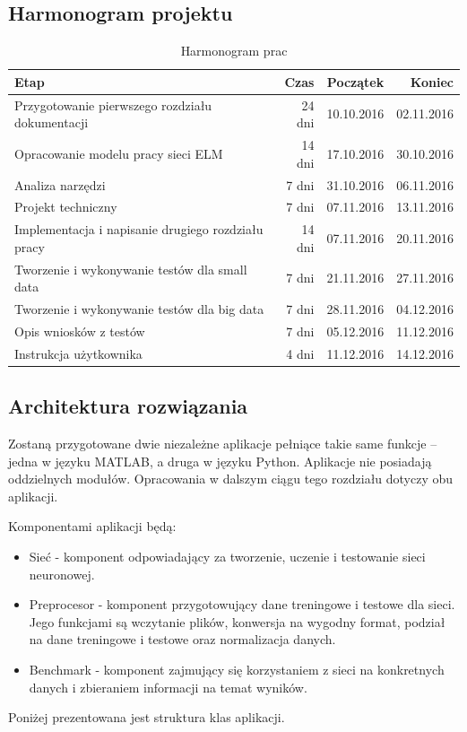 \documentclass{article}
\begin{document}
\subsection{Harmonogram projektu}
\begin{table}[H]
\caption{Harmonogram prac}
\begin{tabular}{|l|r|r|r|}
\hline
\textbf{Etap} & \textbf{Czas} & \textbf{Początek} & \textbf{Koniec} \\
\hline
Przygotowanie pierwszego rozdziału dokumentacji & 24 dni & 10.10.2016 & 02.11.2016 \\
Opracowanie modelu pracy sieci ELM & 14 dni & 17.10.2016 & 30.10.2016 \\
Analiza narzędzi & 7 dni & 31.10.2016 & 06.11.2016 \\
Projekt techniczny & 7 dni & 07.11.2016 & 13.11.2016 \\
Implementacja i napisanie drugiego rozdziału pracy & 14 dni & 07.11.2016 & 20.11.2016 \\
Tworzenie i wykonywanie testów dla small data & 7 dni & 21.11.2016 & 27.11.2016 \\
Tworzenie i wykonywanie testów dla big data & 7 dni & 28.11.2016 & 04.12.2016 \\
Opis wniosków z testów & 7 dni & 05.12.2016 & 11.12.2016 \\
Instrukcja użytkownika & 4 dni & 11.12.2016 & 14.12.2016 \\
\hline
\end{tabular}
\end{table}
\subsection{Architektura rozwiązania}
Zostaną przygotowane dwie niezależne aplikacje pełniące takie same funkcje -- jedna w języku MATLAB, a druga w języku Python. Aplikacje nie posiadają oddzielnych modułów. Opracowania w dalszym ciągu tego rozdziału dotyczy obu aplikacji.

Komponentami aplikacji będą:
\begin{itemize}
\item Sieć - komponent odpowiadający za tworzenie, uczenie i testowanie sieci neuronowej.
\item Preprocesor - komponent przygotowujący dane treningowe i testowe dla sieci. Jego funkcjami są wczytanie plików, konwersja na wygodny format, podział na dane treningowe i testowe oraz normalizacja danych.
\item Benchmark - komponent zajmujący się korzystaniem z sieci na konkretnych danych i zbieraniem informacji na temat wyników.
\end{itemize}
Poniżej prezentowana jest struktura klas aplikacji.
\end{document}
